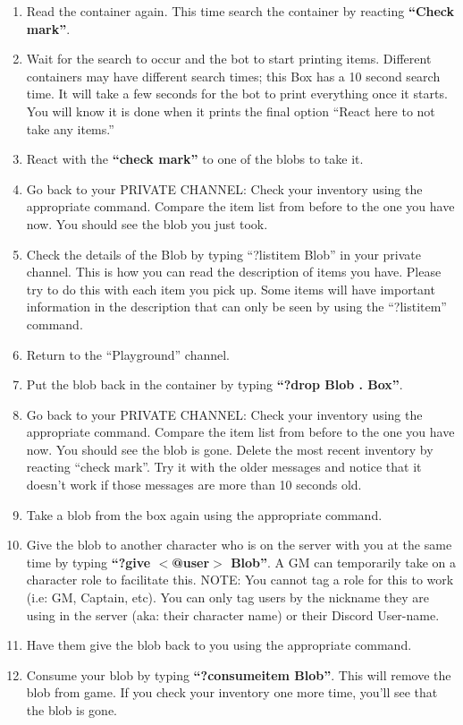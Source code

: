 \documentclass[green]{TMFHope}
\begin{document}
\begin{enumerate}
	\item Read the container again. This time search the container by reacting \textbf{``Check mark''}.
	\item Wait for the search to occur and the bot to start printing items. Different containers may have different search times; this Box has a 10 second search time. It will take a few seconds for the bot to print everything once it starts. You will know it is done when it prints the final option ``React here to not take any items.''
	\item React with the \textbf{``check mark''} to one of the blobs to take it.
	\item Go back to your PRIVATE CHANNEL: Check your inventory using the appropriate command. Compare the item list from before to the one you have now. You should see the blob you just took. 
	\item Check the details of the Blob by typing ``?listitem Blob'' in your private channel. This is how you can read the description of items you have. Please try to do this with each item you pick up. Some items will have important information in the description that can only be seen by using the ``?listitem'' command.
	\item Return to the ``Playground'' channel.
	\item Put the blob back in the container by typing \textbf{``?drop Blob . Box''}.
	\item Go back to your PRIVATE CHANNEL: Check your inventory using the appropriate command. Compare the item list from before to the one you have now. You should see the blob is gone. Delete the most recent inventory by reacting ``check mark''. Try it with the older messages and notice that it doesn't work if those messages are more than 10 seconds old.
	\item Take a blob from the box again using the appropriate command.
	\item Give the blob to another character who is on the server with you at the same time by typing \textbf{``?give $<$@user$>$ Blob''}. A GM can temporarily take on a character role to facilitate this. NOTE: You cannot tag a role for this to work (i.e: GM, Captain, etc). You can only tag users by the nickname they are using in the server (aka: their character name) or their Discord User-name.
	\item Have them give the blob back to you using the appropriate command.
	\item Consume your blob by typing \textbf{``?consumeitem Blob''}. This will remove the blob from game. If you check your inventory one more time, you'll see that the blob is gone.
\end{enumerate}
\end{document}
